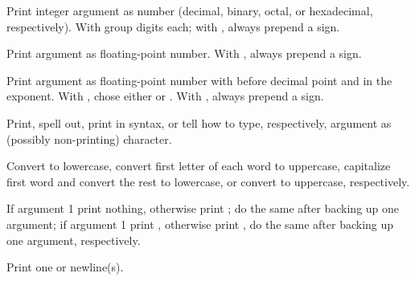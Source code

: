 \begin{LIST}{1cm}
\begin{LIST}{.5cm}
    {
    Print integer argument as number (decimal, binary, octal, or
    hexadecimal, respectively). With \kwd{:} group digits 
     each; with , always prepend a sign.
  }

    {
    Print argument as floating-point number. With , always prepend a sign.
  }

    {
    Print argument as floating-point number with 
    before decimal point and  in the
    exponent. With , chose either  or . With , always prepend a sign.
  }

    {
    Print, spell out, print in \kwd{\#$\backslash$} syntax, or tell how to type, respectively, argument as
    (possibly non-printing) character.
  }

    {
    Convert to lowercase, convert first letter of each word to
    uppercase, capitalize first word and convert
    the rest to lowercase, or convert to uppercase, respectively.
  }

    {
    If argument  1 print nothing, otherwise print ;
    do the same after backing up one argument; if argument  1
    print , otherwise print , do the same after
    backing up one argument, respectively. 
  }

    {
    Print one or  newline(s).
  }


\end{LIST}
\end{LIST}

